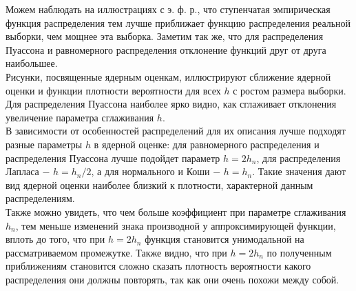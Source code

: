 Можем наблюдать на иллюстрациях с э. ф. р., что ступенчатая эмпирическая функция распределения тем лучше приближает функцию распределения реальной выборки, чем мощнее эта выборка. Заметим так же, что для распределения Пуассона и равномерного распределения отклонение функций друг от друга наибольшее. \\

Рисунки, посвященные ядерным оценкам, иллюстрируют сближение ядерной оценки и функции плотности вероятности для всех $h$ с ростом размера выборки. Для распределения Пуассона наиболее ярко видно, как сглаживает отклонения увеличение параметра сглаживания $h$. \\

В зависимости от особенностей распределений для их описания лучше подходят разные параметры $h$ в ядерной оценке: для равномерного распределения и распределения Пуассона лучше подойдет параметр $h=2h_{n}$, для распределения Лапласа − $h=h_{n}/2$, а для нормального и Коши − $h=h_{n}$. Такие значения дают вид ядерной оценки наиболее близкий к плотности, характерной данным распределениям. \\

Также можно увидеть, что чем больше коэффициент при параметре сглаживания $h_{n}$, тем меньше изменений знака производной у аппроксимирующей функции, вплоть до того, что при $h=2h_{n}$ функция становится унимодальной на рассматриваемом промежутке. Также видно, что при $h=2h_{n}$ по полученным приближениям становится сложно сказать плотность вероятности какого распределения они должны повторять, так как они очень похожи между собой.

\newpage
